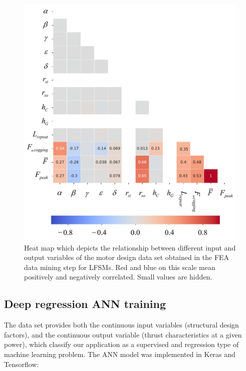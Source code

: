             
            \begin{figure}
                \centering
                \includegraphics[width=5in, trim=0 0 0 129mm, clip]{chap4/images2/heatmap.pdf}
                \caption{Heat map which depicts the relationship between different input and output variables of the motor design data set obtained in the \acs{FEA} data mining step for \acsp{LFSM}. Red and blue on this scale mean positively and negatively correlated. Small values are hidden.}
                \label{fig:chap/rsm/LFSM/data mining/heat map}
            \end{figure}
        
        
        \subsection{Deep regression ANN training}   \label{Chapter:RSM/LFSM/ANN training}
        
        
            The data set provides both the continuous input variables (structural design factors), and the continuous output variable (thrust characteristics at a given power), which classify our application as a supervised and regression type of machine learning problem. The ANN model was implemented in Keras and Tensorflow:

